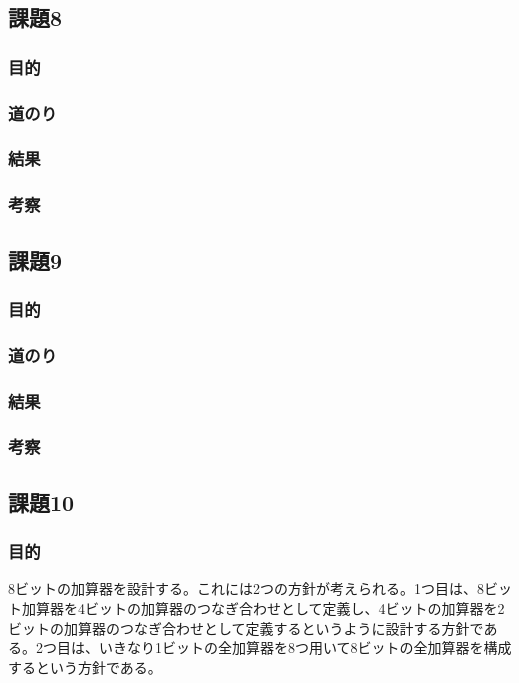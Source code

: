 \documentclass[a4paper]{jarticle}
\begin{document}
\subsection{課題8}
\subsubsection{目的}
\subsubsection{道のり}
\subsubsection{結果}
\subsubsection{考察}
\subsection{課題9}
\subsubsection{目的}
\subsubsection{道のり}
\subsubsection{結果}
\subsubsection{考察}
\subsection{課題10}
\subsubsection{目的}
8ビットの加算器を設計する。これには2つの方針が考えられる。1つ目は、8ビット加算器を4ビットの加算器のつなぎ合わせとして定義し、4ビットの加算器を2ビットの加算器のつなぎ合わせとして定義するというように設計する方針である。2つ目は、いきなり1ビットの全加算器を8つ用いて8ビットの全加算器を構成するという方針である。
\end{document}
